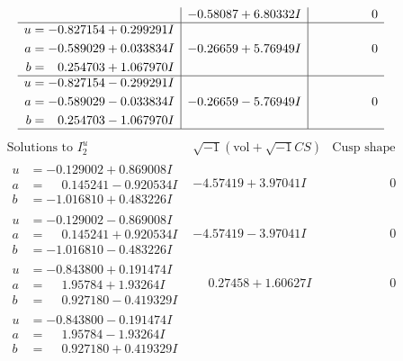 \documentclass[1p]{elsarticle_modified}
\theoremstyle{definition}
\newcommand{\I}{\sqrt{-1}}
\begin{document}
$$\begin{array}{c|c|c}
 & -0.58087 + 6.80332 I & \phantom{-0.000000 } 0 \\ \hline\begin{aligned}
u &= -0.827154 + 0.299291 I \\
a &= -0.589029 + 0.033834 I \\
b &= \phantom{-}0.254703 + 1.067970 I\end{aligned}
 & -0.26659 + 5.76949 I & \phantom{-0.000000 } 0 \\ \hline\begin{aligned}
u &= -0.827154 - 0.299291 I \\
a &= -0.589029 - 0.033834 I \\
b &= \phantom{-}0.254703 - 1.067970 I\end{aligned}
 & -0.26659 - 5.76949 I & \phantom{-0.000000 } 0\\
 \hline 
 \end{array}$$\newpage$$\begin{array}{c|c|c}  
\text{Solutions to }I^u_{2}& \I (\text{vol} + \sqrt{-1}CS) & \text{Cusp shape}\\
 \hline 
\begin{aligned}
u &= -0.129002 + 0.869008 I \\
a &= \phantom{-}0.145241 - 0.920534 I \\
b &= -1.016810 + 0.483226 I\end{aligned}
 & -4.57419 + 3.97041 I & \phantom{-0.000000 } 0 \\ \hline\begin{aligned}
u &= -0.129002 - 0.869008 I \\
a &= \phantom{-}0.145241 + 0.920534 I \\
b &= -1.016810 - 0.483226 I\end{aligned}
 & -4.57419 - 3.97041 I & \phantom{-0.000000 } 0 \\ \hline\begin{aligned}
u &= -0.843800 + 0.191474 I \\
a &= \phantom{-}1.95784 + 1.93264 I \\
b &= \phantom{-}0.927180 - 0.419329 I\end{aligned}
 & \phantom{-}0.27458 + 1.60627 I & \phantom{-0.000000 } 0 \\ \hline\begin{aligned}
u &= -0.843800 - 0.191474 I \\
a &= \phantom{-}1.95784 - 1.93264 I \\
b &= \phantom{-}0.927180 + 0.419329 I\end{aligned}

\end{array}$$
\end{document}
